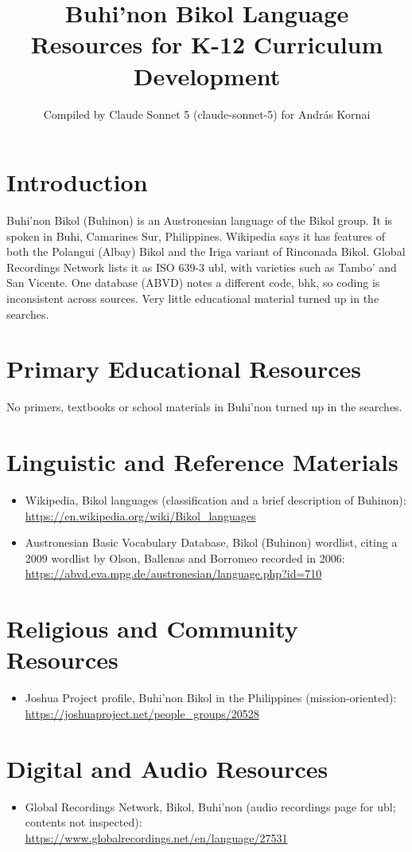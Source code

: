 \documentclass[12pt]{article}
\title{Buhi'non Bikol Language Resources for K-12 Curriculum Development}
\author{Compiled by Claude Sonnet 5 (claude-sonnet-5) for Andr\'as Kornai}
\date{}
\begin{document}
\maketitle

\section{Introduction}
Buhi'non Bikol (Buhinon) is an Austronesian language of the Bikol group. It is spoken in Buhi, Camarines Sur, Philippines. Wikipedia says it has features of both the Polangui (Albay) Bikol and the Iriga variant of Rinconada Bikol. Global Recordings Network lists it as ISO 639-3 ubl, with varieties such as Tambo' and San Vicente. One database (ABVD) notes a different code, bhk, so coding is inconsistent across sources. Very little educational material turned up in the searches.

\section{Primary Educational Resources}
No primers, textbooks or school materials in Buhi'non turned up in the searches.

\section{Linguistic and Reference Materials}
\begin{itemize}
\item Wikipedia, Bikol languages (classification and a brief description of Buhinon): \url{https://en.wikipedia.org/wiki/Bikol_languages}
\item Austronesian Basic Vocabulary Database, Bikol (Buhinon) wordlist, citing a 2009 wordlist by Olson, Ballenas and Borromeo recorded in 2006: \url{https://abvd.eva.mpg.de/austronesian/language.php?id=710}
\end{itemize}

\section{Religious and Community Resources}
\begin{itemize}
\item Joshua Project profile, Buhi'non Bikol in the Philippines (mission-oriented): \url{https://joshuaproject.net/people_groups/20528}
\end{itemize}

\section{Digital and Audio Resources}
\begin{itemize}
\item Global Recordings Network, Bikol, Buhi'non (audio recordings page for ubl; contents not inspected): \url{https://www.globalrecordings.net/en/language/27531}
\end{itemize}
\end{document}
